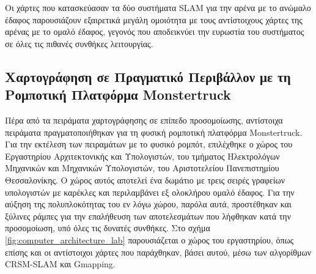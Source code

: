 \bigskip
Οι χάρτες που κατασκεύασαν τα δύο συστήματα SLAM για την αρένα με το ανώμαλο έδαφος παρουσιάζουν εξαιρετικά μεγάλη ομοιότητα με τους αντίστοιχους χάρτες της αρένας με το ομαλό έδαφος, γεγονός που αποδεικνύει την ευρωστία του συστήματος σε όλες τις πιθανές συνθήκες λειτουργίας.

\subsection{Χαρτογράφηση σε Πραγματικό Περιβάλλον με τη Ρομποτική Πλατφόρμα Monstertruck}
Πέρα από τα πειράματα χαρτογράφησης σε επίπεδο προσομοίωσης, αντίστοιχα πειράματα πραγματοποιήθηκαν για τη φυσική ρομποτική πλατφόρμα Monstertruck. Για την εκτέλεση των πειραμάτων με το φυσικό ρομπότ, επιλέχθηκε ο χώρος του {Εργαστηρίου Αρχιτεκτονικής και Υπολογιστών}, του τμήματος Ηλεκτρολόγων Μηχανικών και Μηχανικών Υπολογιστών, του Αριστοτελείου Πανεπιστημίου Θεσσαλονίκης. Ο χώρος αυτός αποτελεί ένα δωμάτιο με τρεις σειρές γραφείων υπολογιστών με καρέκλες και περιλαμβάνει εξ ολοκλήρου ομαλό έδαφος. Για την αύξηση της πολυπλοκότητας του εν λόγω χώρου, παρόλα αυτά, προστέθηκαν και ξύλινες ράμπες για την επαλήθευση των αποτελεσμάτων που λήφθηκαν κατά την προσομοίωση, υπό όλες τις δυνατές συνθήκες.  Στο σχήμα \ref{fig:computer_architecture_lab} παρουσιάζεται ο χώρος του εργαστηρίου, όπως επίσης και οι αντίστοιχοι χάρτες που παράχθηκαν, βάσει αυτού, μέσω των αλγορίθμων CRSM-SLAM και Gmapping.

